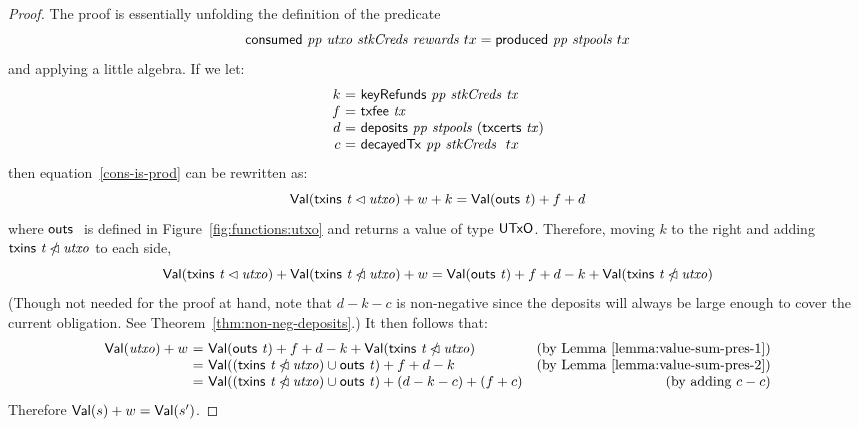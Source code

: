 \begin{proof}
  The proof is essentially unfolding the definition of the predicate
  \begin{equation}
    \label{cons-is-prod}
    \mathsf{consumed}~ \mathit{pp}~ \mathit{utxo}~ \mathit{stkCreds}~ \mathit{rewards}~{tx} = \mathsf{produced}~ \mathit{pp}~ \mathit{stpools}~{tx}
  \end{equation}
  and applying a little algebra.
%
If we let:
  \begin{equation*}
    \begin{array}{r@{~=~}l}
      k & \keyRefunds{pp}{stkCreds}{tx} \\
      f & \txfee{tx} \\
      d & \deposits{pp}{stpools}~{(\txcerts{tx})} \\
      c & \decayedTx{pp}{stkCreds}~{tx} \\
    \end{array}
  \end{equation*}
  then equation~\ref{cons-is-prod} can be rewritten as:
  \begin{equation*}
    \mathsf{Val}(\mathsf{txins}~ \mathit{t} \lhd{\ensuremath{\mathit{utxo}}}) + w + k = \mathsf{Val}(\mathsf{outs}~ \mathit{t}) + f + d
  \end{equation*}
  where $\mathsf{outs}~ \mathit{}$ is defined in Figure~\ref{fig:functions:utxo} and returns a value of type $\mathsf{UTxO}$.
  Therefore, moving $k$ to the right and adding $\mathsf{txins}~ \mathit{t} \mathbin{\slashed{\lhd}}{\mathit{utxo}}$ to each side,
  \begin{equation*}
    \mathsf{Val}(\mathsf{txins}~ \mathit{t} \lhd{\ensuremath{\mathit{utxo}}}) + \mathsf{Val}(\mathsf{txins}~ \mathit{t} \mathbin{\slashed{\lhd}}{\mathit{utxo}}) + w
    = \mathsf{Val}(\mathsf{outs}~ \mathit{t}) + f + d - k + \mathsf{Val}(\mathsf{txins}~ \mathit{t} \mathbin{\slashed{\lhd}}{\mathit{utxo}})
  \end{equation*}
  (Though not needed for the proof at hand,
  note that $d-k-c$ is non-negative since the deposits will always be large enough to cover
  the current obligation. See Theorem~\ref{thm:non-neg-deposits}.)
%
  It then follows that:
  \begin{equation*}
    \begin{array}{r@{~=~}lr}
      \Val(\var{utxo}) + w
    & \Val(\outs{t}) + f + d - k + \Val(\txins{t} \subtractdom{\var{utxo}})
    & \text{(by Lemma~\ref{lemma:value-sum-pres-1})}
    \\
    & \Val((\txins{t} \subtractdom{\var{utxo}})\cup\outs{t}) + f + d - k
    & \text{(by Lemma~\ref{lemma:value-sum-pres-2})}
    \\
    & \Val((\txins{t} \subtractdom{\var{utxo}})\cup\outs{t}) + (d-k-c) + (f+c)
    & \text{(by adding $c-c$)}
    \end{array}
  \end{equation*}
  Therefore $\mathsf{Val}(s) + w = \mathsf{Val}(s')$.
\end{proof}

